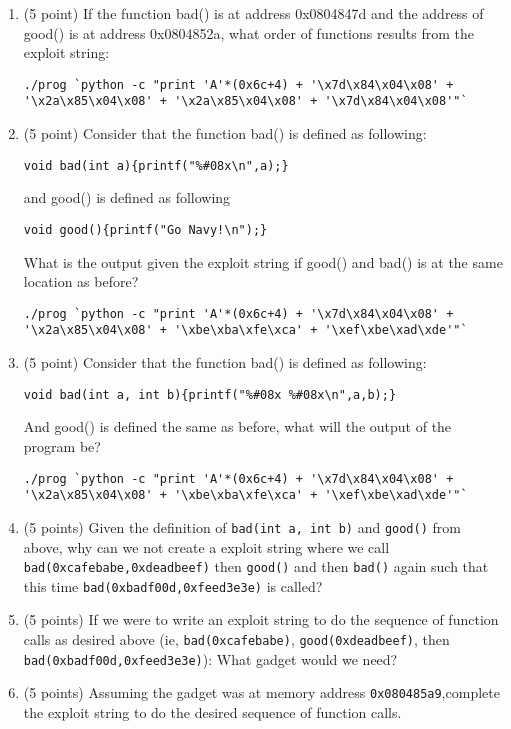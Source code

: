\documentclass{article}[9pt]
\begin{document}
\begin{enumerate}
\item (5 point) If the function bad() is at address 0x0804847d and the address of
good() is at address 0x0804852a, what order of functions results
from the exploit string:

\begin{verbatim}
./prog `python -c "print 'A'*(0x6c+4) + '\x7d\x84\x04\x08' + '\x2a\x85\x04\x08' + '\x2a\x85\x04\x08' + '\x7d\x84\x04\x08'"`
\end{verbatim}

\item (5 point) Consider that the function bad() is defined as following:

\begin{verbatim}
void bad(int a){printf("%#08x\n",a);}     
\end{verbatim}

and good() is defined as following

\begin{verbatim}
void good(){printf("Go Navy!\n");}     
\end{verbatim}

What is the output given the exploit string if good() and bad()
is at the same location as before?

\begin{verbatim}
./prog `python -c "print 'A'*(0x6c+4) + '\x7d\x84\x04\x08' + '\x2a\x85\x04\x08' + '\xbe\xba\xfe\xca' + '\xef\xbe\xad\xde'"`
\end{verbatim}

\item (5 point) Consider that the function bad() is defined as following:
\begin{verbatim}
void bad(int a, int b){printf("%#08x %#08x\n",a,b);}      
\end{verbatim}

And good() is defined the same as before, what will the output of the program be?

\begin{verbatim}
./prog `python -c "print 'A'*(0x6c+4) + '\x7d\x84\x04\x08' + '\x2a\x85\x04\x08' + '\xbe\xba\xfe\xca' + '\xef\xbe\xad\xde'"`      
\end{verbatim}

\item (5 points) Given the definition of \texttt{bad(int a, int b)} and \texttt{good()} from
above, why can we not create a exploit string where we call
\texttt{bad(0xcafebabe,0xdeadbeef)} then \texttt{good()} and then \texttt{bad()} again
such that this time \texttt{bad(0xbadf00d,0xfeed3e3e)} is called?

\item (5 points) If we were to write an exploit string to do the sequence of
function calls as desired above (ie, \texttt{bad(0xcafebabe)},
\texttt{good(0xdeadbeef)}, then \texttt{bad(0xbadf00d,0xfeed3e3e)}): What
gadget would we need?

\item (5 points) Assuming the gadget was at memory address \texttt{0x080485a9},complete
the exploit string to do the desired sequence of function calls.
\end{enumerate}
\end{document}
